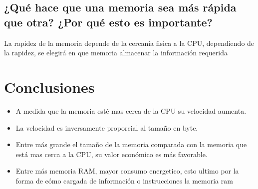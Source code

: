 \documentclass[12pt,letterpaper]{article}
\begin{document}
    \subsection{¿Qué hace que una memoria sea más rápida que otra? ¿Por qué esto es importante?}
        La rapidez de la memoria depende de la cercania fisica a la CPU, dependiendo de la rapidez, se elegirá en que memoria almacenar la información requerida 
        
\newpage

\section{Conclusiones}
    \begin{itemize}
     \item A medida que la memoria esté mas cerca de la CPU su velocidad aumenta.
     \item La velocidad es inversamente proporcial al tamaño en byte.
     \item Entre más grande el tamaño de la memoria comparada con la memoria que está mas cerca a la CPU, su valor económico es más favorable.
     \item Entre más memoria RAM, mayor consumo energetico, esto ultimo por la forma de cómo cargada de información o instrucciones la memoria ram
    \end{itemize}

\newpage



\end{document}
